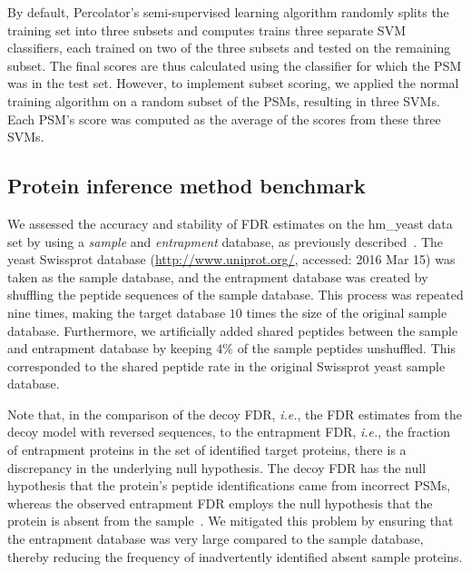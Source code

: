 \documentclass{article}
\begin{document}
By default, Percolator's semi-supervised learning algorithm randomly
splits the training set into three subsets and computes trains three
separate SVM classifiers, each trained on two of the three subsets and
tested on the remaining subset.  The final scores are thus calculated
using the classifier for which the PSM was in the test set. However,
to implement subset scoring, we applied the normal training algorithm
on a random subset of the PSMs, resulting in three SVMs.  Each PSM's
score was computed as the average of the scores from these three SVMs.

\subsection*{Protein inference method benchmark}

We assessed the accuracy and stability of FDR estimates on the
hm\_yeast data set by using a {\em sample} and {\em entrapment}
database, as previously described~\cite{granholm2013determining}. The
yeast Swissprot database (\url{http://www.uniprot.org/}, accessed:
2016 Mar 15) was taken as the sample database, and the entrapment
database was created by shuffling the peptide sequences of the sample
database. This process was repeated nine times, making the target
database $10$ times the size of the original sample database.
Furthermore, we artificially added shared peptides between the sample
and entrapment database by keeping $4\%$ of the sample peptides
unshuffled. This corresponded to the shared peptide rate in the
original Swissprot yeast sample database.


Note that, in the comparison of the decoy FDR, {\em i.e.}, the FDR 
estimates from the decoy model with reversed sequences, to the 
entrapment FDR, {\em i.e.}, the fraction of entrapment proteins in the 
set of identified target proteins, there is a discrepancy in the 
underlying null hypothesis. The decoy FDR has the null hypothesis that 
the protein's peptide identifications came from incorrect PSMs, 
whereas the observed entrapment FDR employs the null hypothesis that 
the protein is absent from the sample~\cite{the:how}. We mitigated 
this problem by ensuring that the entrapment database was very large 
compared to the sample database, thereby reducing the frequency of 
inadvertently identified absent sample proteins.
\end{document}
